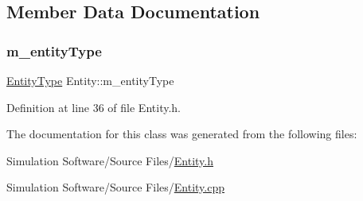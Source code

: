 \subsection{Member Data Documentation}
\mbox{\label{class_entity_a3431bdb8f5536c20eba5391e97e5ca8e}} 
\subsubsection{\texorpdfstring{m\+\_\+entity\+Type}{m\_entityType}}
{\footnotesize\ttfamily \hyperlink{_entity_8h_ad79a57ed3105eb60d991a1aeb4a9dc44}{Entity\+Type} Entity\+::m\+\_\+entity\+Type\hspace{0.3cm}{\ttfamily [protected]}}



Definition at line 36 of file Entity.\+h.



The documentation for this class was generated from the following files\+:\begin{DoxyCompactItemize}
\item 
Simulation Software/\+Source Files/\hyperlink{_entity_8h}{Entity.\+h}\item 
Simulation Software/\+Source Files/\hyperlink{_entity_8cpp}{Entity.\+cpp}\end{DoxyCompactItemize}
